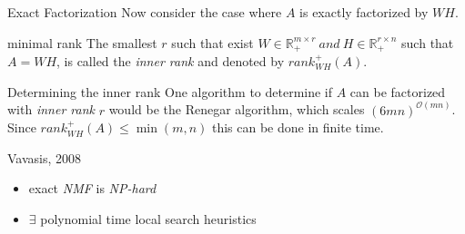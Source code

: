 \documentclass[aspectratio=169]{beamer}
\begin{document}
\begin{frame}{Exact Factorization}
    Now consider the case where $A$ is exactly factorized by $WH$.
    \begin{block}{minimal rank}
        The smallest $r$ such that exist \(W \in \mathbb{R}^{m \times r}_+ \ and \ H \in \mathbb{R}^{r \times n}_+\) such that $A=WH$, is called the \emph{inner rank} and denoted by $rank_{WH}^+ (A)$. 
    \end{block}

\end{frame}

\begin{frame}{Determining the inner rank}
    One algorithm to determine if $A$ can be factorized with \emph{inner rank} $r$ would be the Renegar algorithm, which scales $(6mn)^{\mathcal{O}(mn)}$. \\
    Since $rank_{WH}^+ (A) \leq \min(m,n)$ this can be done in finite time.
    \begin{block}{Vavasis, 2008}
        \begin{itemize}
            \item exact \emph{NMF} is \emph{NP-hard}
            \item $\exists$ polynomial time local search heuristics
        \end{itemize}
    \end{block}
\end{frame}

\end{document}
